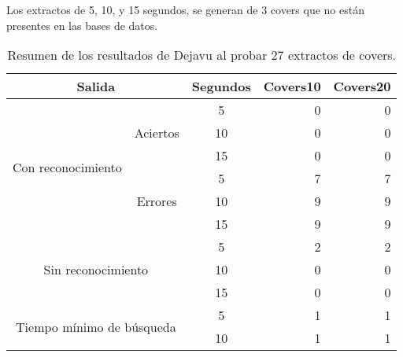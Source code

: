 \begin{sidewaystable}
\centering
\caption{Resumen de los resultados de Dejavu al probar 27 extractos de covers.}{Los extractos de 5, 10, y 15 segundos, se generan de 3 covers que no están presentes en las bases de datos.}
\label{tab:ResumenCoversNoPresentes}
\begin{tabular}{@{}ccc|rr@{}}
\toprule
\midrule
\multicolumn{2}{c}{Salida}                                         & Segundos & \multicolumn{1}{c}{Covers10} & \multicolumn{1}{c}{Covers20} \\ \midrule
\multirow{6}{*}{Con reconocimiento}   & \multirow{3}{*}{Aciertos}  & 5        & 0                            & 0                            \\
                                      &                            & 10       & 0                            & 0                            \\
                                      &                            & 15       & 0                            & 0                            \\ \cmidrule{2-5}
                                      & \multirow{3}{*}{Errores}   & 5        & 7                            & 7                            \\
                                      &                            & 10       & 9                            & 9                            \\
                                      &                            & 15       & 9                            & 9                            \\
\midrule
\multicolumn{2}{c}{\multirow{3}{*}{Sin reconocimiento}}            & 5        & 2                            & 2                            \\
\multicolumn{2}{c}{}                                               & 10       & 0                            & 0                            \\
\multicolumn{2}{c}{}                                               & 15       & 0                            & 0                            \\
\midrule
\multicolumn{2}{c}{\multirow{3}{*}{Tiempo mínimo de búsqueda}}     & 5        & 1                            & 1                            \\
\multicolumn{2}{c}{}                                               & 10       & 1                            & 1                            \\

\end{tabular}
\end{sidewaystable}

